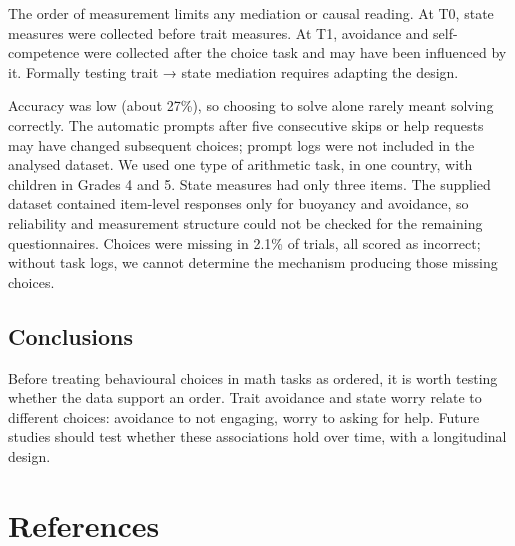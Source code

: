 \documentclass[
  man,
  floatsintext,
  longtable,
  nolmodern,
  notxfonts,
  notimes,
  colorlinks=true,linkcolor=blue,citecolor=blue,urlcolor=blue]{apa7}
\begin{document}
The order of measurement limits any mediation or causal reading. At T0,
state measures were collected before trait measures. At T1, avoidance
and self-competence were collected after the choice task and may have
been influenced by it. Formally testing trait → state mediation requires
adapting the design.

Accuracy was low (about 27\%), so choosing to solve alone rarely meant
solving correctly. The automatic prompts after five consecutive skips or
help requests may have changed subsequent choices; prompt logs were not
included in the analysed dataset. We used one type of arithmetic task,
in one country, with children in Grades 4 and 5. State measures had only
three items. The supplied dataset contained item-level responses only
for buoyancy and avoidance, so reliability and measurement structure
could not be checked for the remaining questionnaires. Choices were
missing in 2.1\% of trials, all scored as incorrect; without task logs,
we cannot determine the mechanism producing those missing choices.

\subsection{Conclusions}\label{conclusions}

Before treating behavioural choices in math tasks as ordered, it is
worth testing whether the data support an order. Trait avoidance and
state worry relate to different choices: avoidance to not engaging,
worry to asking for help. Future studies should test whether these
associations hold over time, with a longitudinal design.

\section{References}\label{references}
\end{document}
